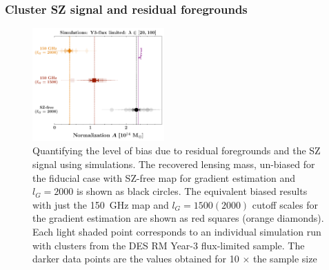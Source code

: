\begin{table}[ht]
\caption{Systematic error budget for DES RM volume-limited sample}
\footnotesize{
}
\label{tab:sys}
\end{table}
\subsubsection{Cluster SZ signal and residual foregrounds}\label{subsec_SZbias}

\begin{figure}
\centering

\includegraphics[width=0.45\textwidth, keepaspectratio]{figs/tSZ_bias_checks_sehgal_sims.pdf}
\caption{ Quantifying the level of bias due to residual foregrounds and the SZ signal using \citet{sehgal10} simulations. The recovered lensing mass, un-biased for the fiducial case with SZ-free map for gradient estimation and $l_{G} = 2000$ is shown as black circles. The equivalent biased results with just the 150\, GHz map and $l_{G} = 1500 (2000)$ cutoff scales for the gradient estimation are shown as red squares (orange diamonds). Each light shaded point corresponds to an individual simulation run with clusters from the DES RM Year-3 flux-limited sample. The darker data points are the values obtained for 10 $\times$ the sample size}
\label{fig_QE_sehgal_sims}
\end{figure}

